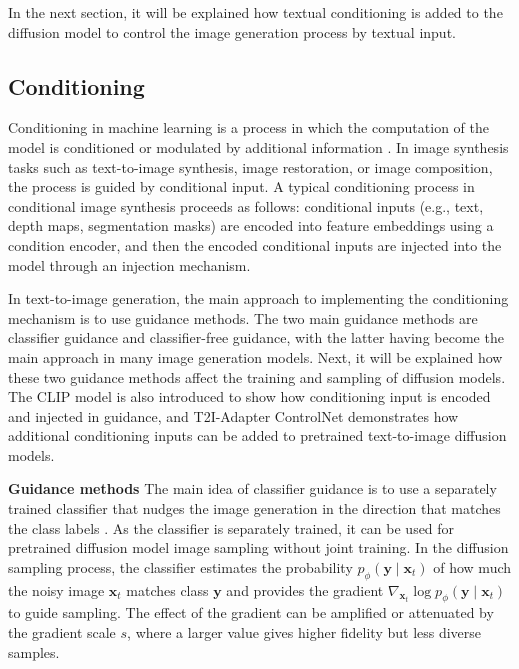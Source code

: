In the next section, it will be explained how textual conditioning is added to the diffusion model to control the image generation process by textual input.

\subsection{Conditioning}
\label{sec:conditioning}
Conditioning in machine learning is a process in which the computation of the model is conditioned or modulated by additional information \cite{margatina2019attentionbasedconditioningmethodsexternal}. In image synthesis tasks such as text-to-image synthesis, image restoration, or image composition, the process is guided by conditional input. A typical conditioning process in conditional image synthesis proceeds as follows: conditional inputs (e.g., text, depth maps, segmentation masks) are encoded into feature embeddings using a condition encoder, and then the encoded conditional inputs are injected into the model through an injection mechanism. \cite{zhan2025conditionalimagesynthesisdiffusion}

In text-to-image generation, the main approach to implementing the conditioning mechanism is to use guidance methods. The two main guidance methods are classifier guidance and classifier-free guidance, with the latter having become the main approach in many image generation models. \cite{zhan2025conditionalimagesynthesisdiffusion} Next, it will be explained how these two guidance methods affect the training and sampling of diffusion models. The CLIP model is also introduced to show how conditioning input is encoded and injected in guidance, and T2I-Adapter ControlNet demonstrates how additional conditioning inputs can be added to pretrained text-to-image diffusion models.

{\textbf{Guidance methods}}
The main idea of classifier guidance is to use a separately trained classifier that nudges the image generation in the direction that matches the class labels \cite{strümke2023lecturenotesprobabilisticdiffusion}. As the classifier is separately trained, it can be used for pretrained diffusion model image sampling without joint training. In the diffusion sampling process, the classifier estimates the probability $p_{\phi}\left(\mathbf{y} \mid \mathbf{x}_{t}\right)$ of how much the noisy image $\mathbf{x}_t$ matches class $\mathbf{y}$ and provides the gradient $\nabla_{\mathbf{x}_t} \log p_{\phi}\left(\mathbf{y} \mid \mathbf{x}_{t}\right)$ to guide sampling. The effect of the gradient can be amplified or attenuated by the gradient scale $s$, where a larger value gives higher fidelity but less diverse samples. \cite{dhariwal2021diffusionmodelsbeatgans}

